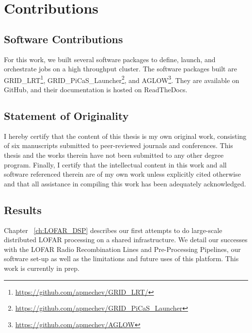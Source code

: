 \section{Contributions}



\subsection{Software Contributions}
 
For this work, we built several software packages to define, launch, and orchestrate jobs on a high throughput cluster. The software packages built are GRID\_LRT\footnote{\url{https://github.com/apmechev/GRID_LRT/}}, GRID\_PiCaS\_Launcher\footnote{\url{https://github.com/apmechev/GRID_PiCaS_Launcher}}, and AGLOW\footnote{\url{https://github.com/apmechev/AGLOW}}. They are available on GitHub, and their documentation is hosted on ReadTheDocs. 


\subsection{Statement of Originality}

I hereby certify that the content of this thesis is my own original work, consisting of six manuscripts submitted to peer-reviewed journals and conferences. This thesis and the works therein have not been submitted to any other degree program. Finally, I certify that the intellectual content in this work and all software referenced therein are of my own work unless explicitly cited otherwise and that all assistance in compiling this work has been adequately acknowledged.

\subsection{Results}

Chapter ~\ref{ch:LOFAR_DSP} describes our first attempts to do large-scale distributed LOFAR processing on a shared infrastructure. We detail our successes with the LOFAR Radio Recombination Lines and Pre-Processing Pipelines, our software set-up as well as the limitations and future uses of this platform.  This work is currently in prep.


